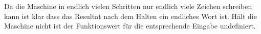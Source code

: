 Da die Maschine in endlich vielen Schritten nur endlich viele Zeichen schreiben kann ist klar dass das Resultat nach dem Halten ein endliches Wort ist.
Hält die Maschine nicht ist der Funktionswert für die entsprechende Eingabe undefiniert.




% 

